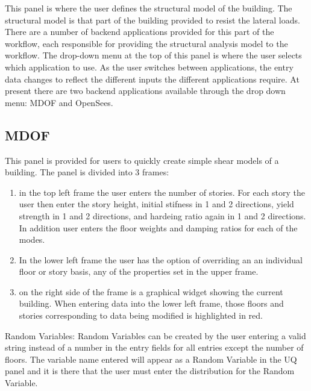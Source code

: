 This panel is where the user defines the structural model of the building. The structural model is that part of the building provided to resist the lateral loads. There are a number of backend applications provided for this part of the workflow, each responsible for providing the structural analysis model to the workflow. The drop-down menu at the top of this panel is where the user selects which application to use. As the user switches between applications, the entry data changes to reflect the different inputs the different applications require. At present there are two backend applications available through the drop down menu: MDOF and OpenSees.

\subsection{MDOF}

This panel is provided for users to quickly create simple shear models of a building. The panel is divided into 3 frames:
\begin{enumerate}
\item in the top left frame the user enters the number of stories. For each story the user then enter the story height, initial stifness in 1 and 2 directions, yield strength in 1 and 2 directions, and hardeing ratio again in 1 and 2 directions. In addition user enters the floor weights and damping ratios for each of the modes.
\item In the lower left frame the user has the option of overriding an an individual floor or story basis, any of the properties set in the upper frame.
\item on the right side of the frame is a graphical widget showing the current building. When entering data into the lower left frame, those floors and stories corresponding to data being modified is highlighted in red.
\end{enumerate} 

Random Variables: Random Variables can be created by the user entering a valid string instead of a number in the entry fields for all entries except the number of floors. The variable name entered will appear as a Random Variable in the UQ panel and it is there that the user must enter the distribution for the Random Variable.


